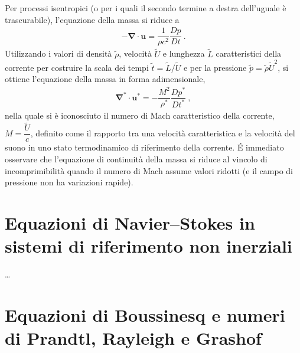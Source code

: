 \documentclass[letterpaper,10pt,italian]{jupyterBook}
\begin{document}
\sphinxAtStartPar
Per processi isentropici (o per i quali il secondo termine a destra
dell’uguale è trascurabile), l’equazione della massa si riduce a
\begin{equation*}
\begin{split}- \mathbf{\nabla} \cdot \mathbf{u} = \dfrac{1}{\rho c^2}\dfrac{D p}{D t} \ .\end{split}
\end{equation*}
\sphinxAtStartPar
Utilizzando i valori di densità \(\tilde{\rho}\), velocità \(\tilde{U}\) e
lunghezza \(\tilde{L}\) caratteristici della corrente per costruire la
scala dei tempi \(\tilde{t} = \tilde{L}/\tilde{U}\) e per la pressione
\(\tilde{p} = \tilde{\rho} \tilde{U}^2\), si ottiene l’equazione della
massa in forma adimensionale,
\begin{equation*}
\begin{split}\mathbf{\nabla}^* \cdot \mathbf{u}^* = -  \dfrac{M^2}{\rho^*} \dfrac{D p^*}{D t^*} \ ,\end{split}
\end{equation*}
\sphinxAtStartPar
nella quale si è iconosciuto il numero di Mach caratteristico della
corrente, \(M = \dfrac{\tilde{U}}{c}\), definito come il rapporto tra una
velocità caratteristica e la velocità del suono in uno stato
termodinamico di riferimento della corrente. É immediato osservare che
l’equazione di continuità della massa si riduce al vincolo di
incomprimibilità quando il numero di Mach assume valori ridotti (e il
campo di pressione non ha variazioni rapide).


\section{Equazioni di Navier–Stokes in sistemi di riferimento non inerziali}
\label{\detokenize{polimi/fluidmechanics-ita/template/capitoli/07_similitudine/07teoria:equazioni-di-navier-stokes-in-sistemi-di-riferimento-non-inerziali}}
\sphinxAtStartPar
…


\section{Equazioni di Boussinesq e numeri di Prandtl, Rayleigh e Grashof}
\label{\detokenize{polimi/fluidmechanics-ita/template/capitoli/07_similitudine/07teoria:equazioni-di-boussinesq-e-numeri-di-prandtl-rayleigh-e-grashof}}
\end{document}
